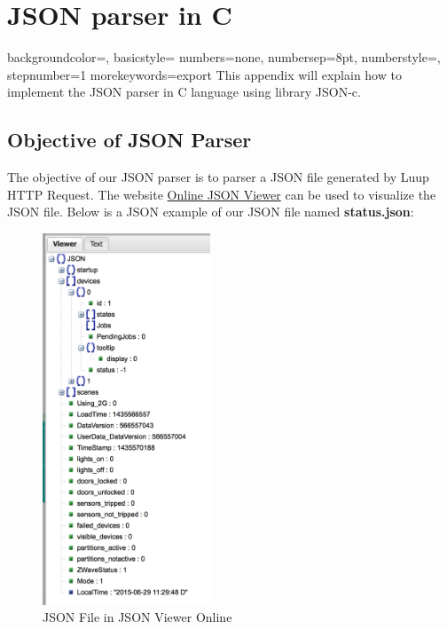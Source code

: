 
\chapter{JSON parser in C} %

\label{AppendixB} %

{
    backgroundcolor=\color{black},
    basicstyle=\scriptsize\color{white}\ttfamily
    numbers=none,
    numbersep=8pt,                   %
    numberstyle=\tiny\color{white}, %
    stepnumber=1                    %
}
{
  morekeywords={export}
}
This appendix will explain how to implement the JSON parser in C language using library JSON-c.
\section{Objective of JSON Parser}
The objective of our JSON parser is to parser a JSON file generated by Luup HTTP Request. The website \href{http://jsonviewer.stack.hu}{Online JSON Viewer} can be used to visualize the JSON file. Below is a JSON example of our JSON file named \textbf{status.json}:

\begin{figure}[htbp]
	\centering
		\includegraphics[width=5cm]{Figures/jsonviewer.png}
	\caption[JSON File in JSON Viewer Online]{JSON File in JSON Viewer Online}
\end{figure}


